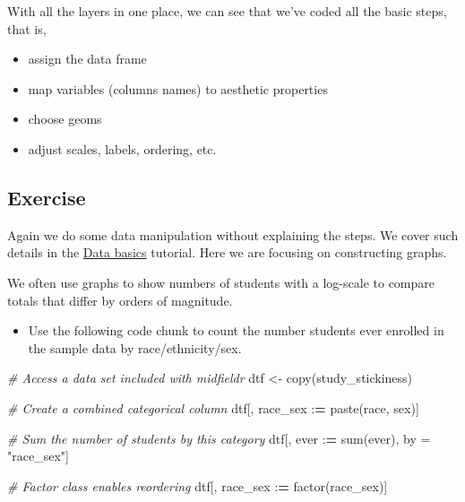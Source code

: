 \documentclass[
]{book}
\newenvironment{Shaded}{\begin{snugshade}}{\end{snugshade}}
\newcommand{\CommentTok}[1]{\textcolor[rgb]{0.56,0.35,0.01}{\textit{#1}}}
\newcommand{\ErrorTok}[1]{\textcolor[rgb]{0.64,0.00,0.00}{\textbf{#1}}}
\newcommand{\FunctionTok}[1]{\textcolor[rgb]{0.00,0.00,0.00}{#1}}
\newcommand{\NormalTok}[1]{#1}
\newcommand{\OtherTok}[1]{\textcolor[rgb]{0.56,0.35,0.01}{#1}}
\newcommand{\SpecialCharTok}[1]{\textcolor[rgb]{0.00,0.00,0.00}{#1}}
\newcommand{\StringTok}[1]{\textcolor[rgb]{0.31,0.60,0.02}{#1}}
\providecommand{\tightlist}{%
  \setlength{\itemsep}{0pt}\setlength{\parskip}{0pt}}
\begin{document}
With all the layers in one place, we can see that we've coded all the basic steps, that is,

\begin{itemize}
\tightlist
\item
  assign the data frame\\
\item
  map variables (columns names) to aesthetic properties\\
\item
  choose geoms\\
\item
  adjust scales, labels, ordering, etc.
\end{itemize}

\hypertarget{exercise-3}{%
\subsection{Exercise}\label{exercise-3}}

Again we do some data manipulation without explaining the steps. We cover such details in the \protect\hyperlink{data-basics}{Data basics} tutorial. Here we are focusing on constructing graphs.

We often use graphs to show numbers of students with a log-scale to compare totals that differ by orders of magnitude.

\begin{itemize}
\tightlist
\item
  Use the following code chunk to count the number students ever enrolled in the sample data by race/ethnicity/sex.
\end{itemize}

\begin{Shaded}
\begin{Highlighting}[]
\CommentTok{\# Access a data set included with midfieldr}
\NormalTok{dtf }\OtherTok{\textless{}{-}} \FunctionTok{copy}\NormalTok{(study\_stickiness)}

\CommentTok{\# Create a combined categorical column }
\NormalTok{dtf[, race\_sex }\SpecialCharTok{:}\ErrorTok{=} \FunctionTok{paste}\NormalTok{(race, sex)]}

\CommentTok{\# Sum the number of students by this category }
\NormalTok{dtf[, ever }\SpecialCharTok{:}\ErrorTok{=} \FunctionTok{sum}\NormalTok{(ever), by }\OtherTok{=} \StringTok{"race\_sex"}\NormalTok{]}

\CommentTok{\# Factor class enables reordering }
\NormalTok{dtf[, race\_sex }\SpecialCharTok{:}\ErrorTok{=} \FunctionTok{factor}\NormalTok{(race\_sex)]}
\end{Highlighting}
\end{Shaded}
\end{document}

